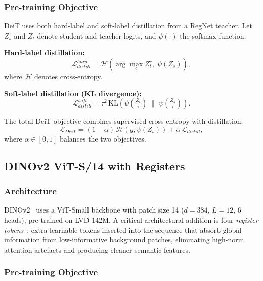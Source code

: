 \documentclass[journal]{IEEEtran}
\begin{document}
\subsubsection{Pre-training Objective}

DeiT uses both hard-label and soft-label distillation from a RegNet teacher. Let $Z_s$ and $Z_t$
denote student and teacher logits, and $\psi(\cdot)$ the softmax function.

\textbf{Hard-label distillation:}
\begin{equation}
    \mathcal{L}_{distill}^{hard} = \mathcal{H}\!\left(\arg\max_c Z_t^c,\; \psi(Z_s)\right),
\end{equation}
where $\mathcal{H}$ denotes cross-entropy.

\textbf{Soft-label distillation (KL divergence):}
\begin{equation}
    \mathcal{L}_{distill}^{soft} = \tau^2 \,
    \text{KL}\!\left(\psi\!\left(\tfrac{Z_t}{\tau}\right) \;\Big\|\;
    \psi\!\left(\tfrac{Z_s}{\tau}\right)\right).
\end{equation}

The total DeiT objective combines supervised cross-entropy with distillation:
\begin{equation}
    \mathcal{L}_{DeiT} = (1 - \alpha)\,\mathcal{H}(y, \psi(Z_s)) +
    \alpha\,\mathcal{L}_{distill},
    \label{eq:deit_loss}
\end{equation}
where $\alpha \in [0, 1]$ balances the two objectives.

\subsection{DINOv2 ViT-S/14 with Registers}

\subsubsection{Architecture}

DINOv2~\cite{oquab2023dinov2} uses a ViT-Small backbone with patch size 14 ($d=384$, $L=12$,
6 heads), pre-trained on LVD-142M. A critical architectural addition is four \textit{register
tokens}~\cite{darcet2023registers}: extra learnable tokens inserted into the sequence that
absorb global information from low-informative background patches, eliminating high-norm
attention artefacts and producing cleaner semantic features.

\subsubsection{Pre-training Objective}
\end{document}
